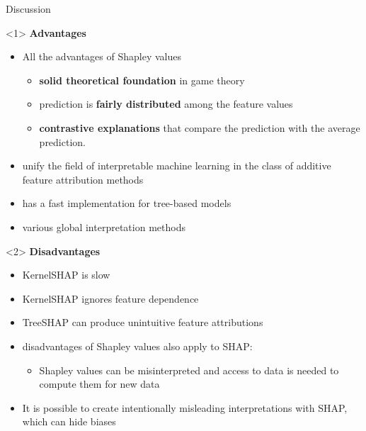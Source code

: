 \documentclass[11pt,compress,t,notes=noshow, aspectratio=169, xcolor=table]{beamer}
\begin{document}
\begin{vbframe}{Discussion}
\begin{onlyenv}<1>
\textbf{Advantages}

\begin{itemize}
    \item All the advantages of Shapley values
    \begin{itemize}
        \item \textbf{solid theoretical foundation} in game theory
        \item prediction is \textbf{fairly distributed} among the feature values
        \item \textbf{contrastive explanations} that compare the prediction with the average prediction.
    \end{itemize} 
    \item unify the field of interpretable machine learning in the class of additive feature attribution methods
    \item has a fast implementation for tree-based models
    \item various global interpretation methods
\end{itemize}
\end{onlyenv}

\begin{onlyenv}<2>
\textbf{Disadvantages}

\begin{itemize}
    \item KernelSHAP is slow
    \item KernelSHAP ignores feature dependence
    \item TreeSHAP can produce unintuitive feature attributions
    \item disadvantages of Shapley values also apply to SHAP:
    \begin{itemize}
        \item Shapley values can be misinterpreted and access to data is needed to compute them for new data
    \end{itemize}
    \item It is possible to create intentionally misleading interpretations with SHAP, which can hide biases
\end{itemize}


\end{onlyenv}

\end{vbframe}

\endlecture
\end{document}
